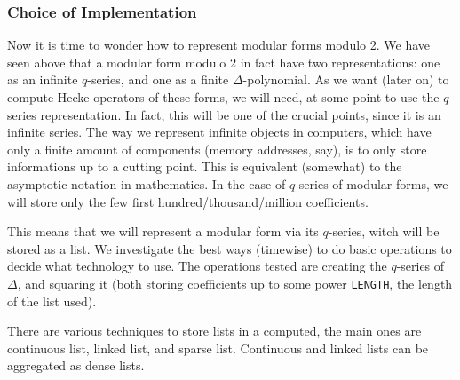 \subsubsection{Choice of Implementation}
Now it is time to wonder how to represent modular forms modulo 2.
We have seen above that a modular form modulo 2 in fact have two representations: one as an infinite $q$-series, and one as a finite $\Delta$-polynomial.
As we want (later on) to compute Hecke operators of these forms, we will need, at some point to use the $q$-series representation.
In fact, this will be one of the crucial points, since it is an infinite series.
The way we represent infinite objects in computers, which have only a finite amount of components (memory addresses, say), is to only store informations up to a cutting point.
This is equivalent (somewhat) to the asymptotic notation in mathematics.
In the case of $q$-series of modular forms, we will store only the few first hundred/thousand/million coefficients.

This means that we will represent a modular form via its $q$-series, witch will be stored as a list.
We investigate the best ways (timewise) to do basic operations to decide what technology to use.
The operations tested are creating the $q$-series of $\Delta$, and squaring it (both storing coefficients up to some power \texttt{LENGTH}, the length of the list used).

There are various techniques to store lists in a computed, the main ones are continuous list, linked list, and sparse list.
Continuous and linked lists can be aggregated as dense lists.

